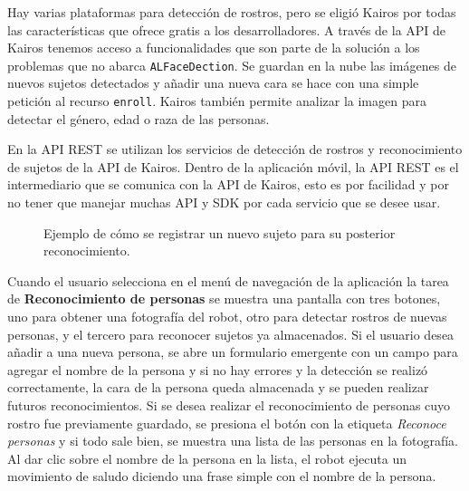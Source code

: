 Hay varias plataformas para detección de rostros, pero 
se eligió Kairos por todas las características que ofrece
gratis a los desarrolladores.
A través de la API de Kairos tenemos acceso
a funcionalidades que son parte de la solución 
a los problemas que no abarca \texttt{ALFaceDection}.
Se guardan en la nube las imágenes de nuevos sujetos
detectados y añadir una nueva cara se hace
con una simple petición al recurso \texttt{enroll}.
Kairos también permite analizar la imagen para detectar el género, 
edad o raza de las personas.

En la API REST se utilizan los servicios de detección de rostros y reconocimiento
de sujetos de la API de Kairos.
Dentro de la aplicación móvil, la API REST es el intermediario
que se comunica con la API de Kairos, esto es por facilidad y por no
tener que manejar muchas API y SDK por cada servicio que se desee usar.

\begin{figure}[htbp]
    \centering
    \qquad
    \qquad
    \caption{Ejemplo de cómo se registrar un nuevo sujeto para su posterior reconocimiento.}
\end{figure}
Cuando el usuario selecciona en el menú de navegación de la aplicación
la tarea de \textbf{Reconocimiento de personas} se muestra una pantalla 
con tres botones, uno para obtener una fotografía del robot, otro para
detectar rostros de nuevas personas, y el tercero para reconocer sujetos
ya almacenados. Si el usuario desea añadir a una nueva persona, se abre un
formulario emergente con un campo para agregar el nombre de la persona y
si no hay errores y la detección se realizó correctamente,
la cara de la persona queda almacenada y se pueden realizar futuros reconocimientos.
Si se desea realizar el reconocimiento de personas cuyo rostro
fue previamente guardado, se presiona el botón con la etiqueta
\textit{Reconoce personas} y si todo sale bien,
se muestra una lista de las personas en la fotografía.
Al dar clic sobre el nombre de la persona en la lista, el robot ejecuta
un movimiento de saludo diciendo una frase simple con el nombre de la persona.



